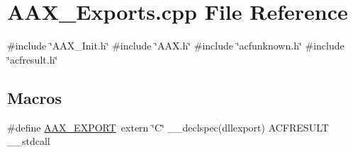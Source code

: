 \hypertarget{a00500}{}\section{A\+A\+X\+\_\+\+Exports.\+cpp File Reference}
\label{a00500}
{\ttfamily \#include \char`\"{}A\+A\+X\+\_\+\+Init.\+h\char`\"{}}\newline
{\ttfamily \#include \char`\"{}A\+A\+X.\+h\char`\"{}}\newline
{\ttfamily \#include \char`\"{}acfunknown.\+h\char`\"{}}\newline
{\ttfamily \#include \char`\"{}acfresult.\+h\char`\"{}}\newline
\subsection*{Macros}
\begin{DoxyCompactItemize}
\item 
\#define \mbox{\hyperlink{a00500_ac70085d71c555deff0dfb54c2b503f4c}{A\+A\+X\+\_\+\+E\+X\+P\+O\+RT}}~extern \char`\"{}C\char`\"{} \+\_\+\+\_\+declspec(dllexport) A\+C\+F\+R\+E\+S\+U\+LT \+\_\+\+\_\+stdcall
\end{DoxyCompactItemize}
